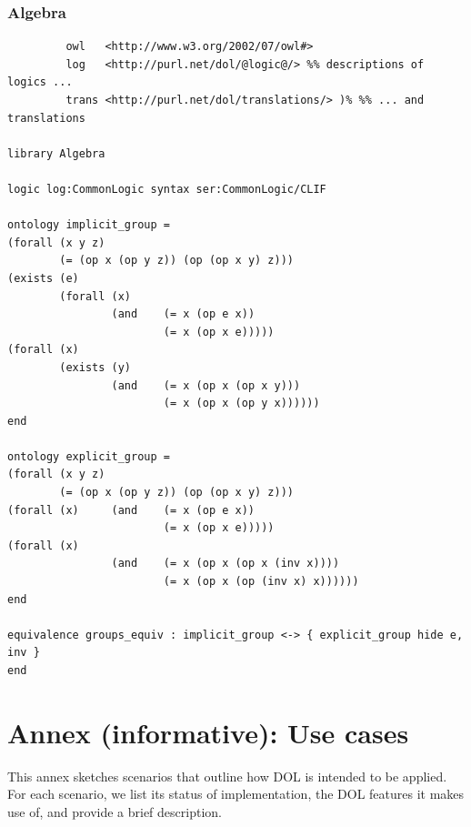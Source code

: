 \documentclass[10pt,%
\ifpretendfinal
final%
\else
draft%
\fi,
]{scrreprt}
\newcommand{\ssclause}[1]{\subsection{#1}}
\newcommand{\infannex}[1]{ \chapter{Annex (informative): #1} }
\begin{document}
\ssclause{Algebra}

\begin{lstlisting}[basicstyle=\ttfamily,language=dolText,morekeywords={props,ObjectProperty,Class,DisjointUnionOf,SubClassOf,Characteristics,Transitive,Asymmetric,SubPropertyOf,DisjointClasses,EquivalentTo,inverse,only,forall,iff,if,or,exists,bridge,distributed},escapechar=@,mathescape]
%prefix( :     <http://www.example.org/alignment#>
         owl   <http://www.w3.org/2002/07/owl#>
         log   <http://purl.net/dol/@logic@/> %% descriptions of logics ...
         trans <http://purl.net/dol/translations/> )% %% ... and translations

library Algebra

logic log:CommonLogic syntax ser:CommonLogic/CLIF

ontology implicit_group =
(forall (x y z)
        (= (op x (op y z)) (op (op x y) z)))
(exists (e)
        (forall (x)
                (and    (= x (op e x))
                        (= x (op x e)))))
(forall (x)
        (exists (y)
                (and    (= x (op x (op x y)))
                        (= x (op x (op y x))))))
end

ontology explicit_group =
(forall (x y z)
        (= (op x (op y z)) (op (op x y) z)))
(forall (x)     (and    (= x (op e x))
                        (= x (op x e)))))
(forall (x)
                (and    (= x (op x (op x (inv x))))
                        (= x (op x (op (inv x) x))))))
end

equivalence groups_equiv : implicit_group <-> { explicit_group hide e, inv }
end

\end{lstlisting}

\infannex{Use cases}

This annex sketches scenarios that outline how DOL is intended to be applied.  For each scenario, we list its status of implementation, the DOL features it makes use of, and provide a brief description.
\end{document}
